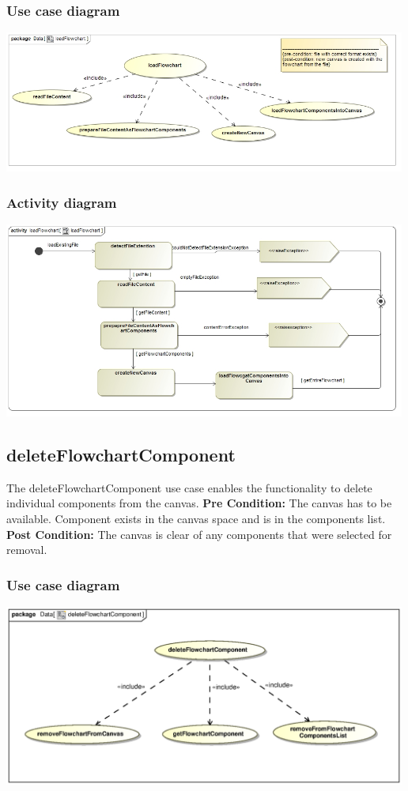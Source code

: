 \documentclass[11pt,a4paper,titlepage]{article}
\begin{document}
\subsubsection{Use case diagram}
\includegraphics[width=500px]{loadFlowchart_use_case_diagram.jpg}

\subsubsection{Activity diagram}
\includegraphics[width=500px]{loadFlowchart_activity_diagram.jpg}


\subsection{deleteFlowchartComponent}
The deleteFlowchartComponent use case enables the functionality to delete individual components from the canvas.
\newline\newline
\textbf{Pre Condition:} The canvas has to be available. Component exists in the canvas space and is in the components list.
\newline\newline
\textbf{Post Condition:} The canvas is clear of any components that were selected for removal.

\subsubsection{Use case diagram}
\includegraphics[width=500px]{deleteFlowchartComponentUseCase.eps}
\end{document}
